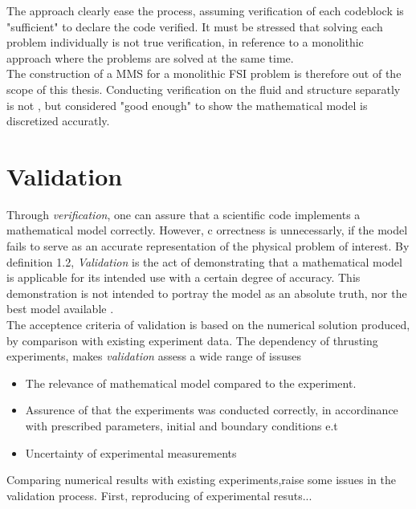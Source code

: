 The approach clearly ease the process, assuming verification of each codeblock is "sufficient" to declare the code verified. It must be stressed that solving each problem individually is not true verification, in reference to a monolithic approach where the problems are solved at the same time.\\The construction of a MMS for a monolithic FSI problem is therefore out of the scope of this thesis. Conducting verification on the fluid and structure separatly is not , but considered "good enough" to show the mathematical model is discretized accuratly.

\section{Validation}
Through \textit{verification}, one can assure that a scientific code implements a mathematical model correctly. However, c
orrectness is unnecessarly, if the model fails to serve as an accurate representation of the physical problem of interest. 
By definition 1.2, \textit{Validation} is the act of demonstrating that a mathematical model is applicable for its intended use with a certain degree of accuracy. This demonstration is not intended to portray the model as an absolute truth, nor the best model available \cite{Rykiel1996}. \\
The acceptence criteria of validation is based on the numerical solution produced, by comparison with existing experiment data. The dependency of thrusting experiments, makes \textit{validation} assess a wide range of issuses \cite{Sommerville2006} 
\begin{itemize}
\item The relevance of mathematical model compared to the experiment.
\item Assurence of that the experiments was conducted correctly, in accordinance with prescribed 
        parameters, initial and boundary conditions e.t
\item Uncertainty of experimental measurements
\end{itemize}

Comparing numerical results with existing experiments,raise some issues in the validation process. First, reproducing of experimental resuts...  









 

